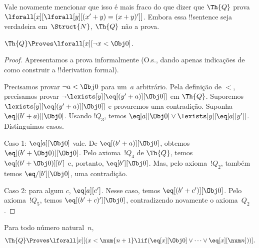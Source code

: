 \documentclass[../../../include/open-logic-section]{subfiles}
\begin{document}
Vale novamente mencionar que isso é mais fraco do que dizer que
$\Th{Q}$ prova $\lforall[x][\lforall[y][(x' + y) = (x + y)']]$.
Embora essa !!{sentence} seja verdadeira em~$\Struct{N}$, $\Th{Q}$ não
a prova.

\begin{lem}
$\Th{Q} \Proves \lforall[x][\lnot x < \Obj 0]$.
\end{lem}

\begin{proof}
Apresentamos a prova informalmente (O.s.\@, dando apenas indicações de
como construir a !!{derivation} formal).

Precisamos provar $\lnot a < \Obj 0$ para um~$a$ arbitrário. Pela
definição de $<$, precisamos provar
$\lnot \lexists[y][\eq[(y'+a)][\Obj 0]]$ em $\Th{Q}$. Suporemos
$\lexists[y][\eq[(y'+a)][\Obj 0]]$ e provaremos uma contradição.
Suponha $\eq[(b'+a)][\Obj 0]$. Usando $!Q_3$, temos
$\eq[a][\Obj 0] \lor \lexists[y][\eq[a][y']]$. Distinguimos casos.

Caso 1: $\eq[a][\Obj 0]$ vale. De $\eq[(b'+a)][\Obj 0]$, obtemos
$\eq[(b' + \Obj 0)][\Obj 0]$. Pelo axioma~$!Q_4$ de $\Th{Q}$, temos
$\eq[(b' + \Obj 0)][b']$ e, portanto, $\eq[b'][\Obj 0]$. Mas, pelo
axioma~$!Q_2$, também temos $\eq/[b'][\Obj 0]$, uma contradição.

Caso 2: para algum $c$, $\eq[a][c']$. Nesse caso, temos
$\eq[(b' + c')][\Obj 0]$. Pelo axioma~$!Q_5$, temos
$\eq[(b' + c)'][\Obj 0]$, contradizendo novamente o axioma~$Q_2$.
\end{proof}

\begin{lem}
Para todo número natural~$n$,
  \[
  \Th{Q} \Proves
  \lforall[x][(x < \num {n+1} \lif (\eq[x][\Obj 0] \lor \dots \lor
    \eq[x][\num n]))].
  \]
\end{lem}
\end{document}
